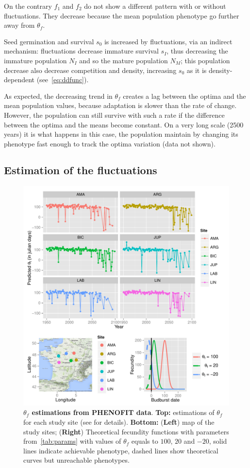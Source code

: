 On the contrary $f_1$ and $f_2$ do not show a different pattern with or without fluctuations. They decrease because the mean population phenotype go further away from $\theta_f$.

Seed germination and survival $s_0$ is increased by fluctuations, via an indirect mechanism: fluctuations decrease immature survival $s_I$, thus decreasing the immature population $N_I$ and so the mature population $N_M$; this population decrease also decrease competition and density, increasing $s_0$ as it is density-dependent (see~\autoref{eq:ddfunc}).

As expected, the decreasing trend in $\theta_f$ creates a lag between the optima and the mean population values, because adaptation is slower than the rate of change. However, the population can still survive with such a rate if the difference between the optima and the means become constant. On a very long scale (2500 years) it is what happens in this case, the population maintain by changing its phenotype fast enough to track the optima variation (data not shown).

\subsection*{Estimation of the fluctuations}

\begin{figure}[ht!]
	\centering
	\includegraphics[scale=1]{Figures/optsmaps.pdf}
	\caption{\textbf{$\theta_{f}$ estimations from PHENOFIT data}. \textbf{Top:} estimations of $\theta_f$ for each study site (see  for details). \textbf{Bottom:} (\textbf{Left}) map of the study sites; (\textbf{Right}) Theoretical fecundity functions with parameters from~\autoref{tab:params} with values of $\theta_f$ equals to $100$, $20$ and $-20$, solid lines indicate achievable phenotype, dashed lines show theoretical curves but unreachable phenotypes.}
	\label{fig:thetaf}
\end{figure}

